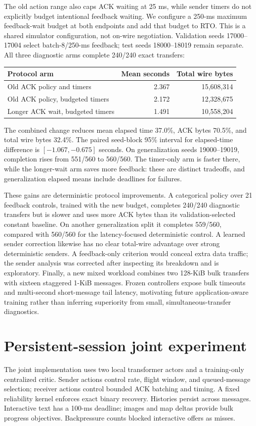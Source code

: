 \documentclass[11pt]{article}
\begin{document}
The old action range also caps ACK waiting at 25 ms, while sender timers do not
explicitly budget intentional feedback waiting. We configure a 250-ms maximum
feedback-wait budget at both endpoints and add that budget to RTO. This is a
shared simulator configuration, not on-wire negotiation. Validation seeds
17000--17004 select batch-8/250-ms feedback; test seeds 18000--18019 remain
separate. All three diagnostic arms complete 240/240 exact transfers:
\begin{center}
\begin{tabular}{lrr}
\toprule
Protocol arm & Mean seconds & Total wire bytes \\
\midrule
Old ACK policy and timers & 2.367 & 15,608,314 \\
Old ACK policy, budgeted timers & 2.172 & 12,328,675 \\
Longer ACK wait, budgeted timers & 1.491 & 10,558,204 \\
\bottomrule
\end{tabular}
\end{center}
The combined change reduces mean elapsed time 37.0\%, ACK bytes 70.5\%, and
total wire bytes 32.4\%. The paired seed-block 95\% interval for elapsed-time
difference is $[-1.067,-0.675]$ seconds. On generalization seeds 19000--19019,
completion rises from 551/560 to 560/560. The timer-only arm is faster there,
while the longer-wait arm saves more feedback: these are distinct tradeoffs,
and generalization elapsed means include deadlines for failures.

These gains are deterministic protocol improvements. A categorical policy over
21 feedback controls, trained with the new budget, completes 240/240 diagnostic
transfers but is slower and uses more ACK bytes than its validation-selected
constant baseline. On another generalization split it completes 559/560,
compared with 560/560 for the latency-focused deterministic control. A learned
sender correction likewise has no clear total-wire advantage over strong
deterministic senders. A feedback-only criterion would conceal extra data
traffic; the sender analysis was corrected after inspecting its breakdown and
is exploratory. Finally, a new mixed workload combines two 128-KiB bulk
transfers with sixteen staggered 1-KiB messages. Frozen controllers expose bulk
timeouts and multi-second short-message tail latency, motivating future
application-aware training rather than inferring superiority from small,
simultaneous-transfer diagnostics.

\section{Persistent-session joint experiment}
The joint implementation uses two local transformer actors and a training-only
centralized critic. Sender actions control rate, flight window, and queued-message
selection; receiver actions control bounded ACK batching and timing. A fixed
reliability kernel enforces exact binary recovery. Histories persist across
messages. Interactive text has a 100-ms deadline; images and map deltas provide
bulk progress objectives. Backpressure counts blocked interactive offers as misses.
\end{document}
